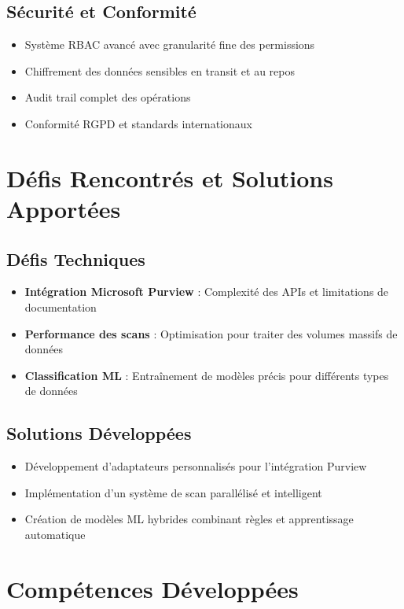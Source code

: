 \documentclass[12pt,a4paper]{article}
\begin{document}
\subsection{Sécurité et Conformité}

\begin{itemize}
    \item Système RBAC avancé avec granularité fine des permissions
    \item Chiffrement des données sensibles en transit et au repos
    \item Audit trail complet des opérations
    \item Conformité RGPD et standards internationaux
\end{itemize}

\section{Défis Rencontrés et Solutions Apportées}

\subsection{Défis Techniques}

\begin{itemize}
    \item \textbf{Intégration Microsoft Purview} : Complexité des APIs et limitations de documentation
    \item \textbf{Performance des scans} : Optimisation pour traiter des volumes massifs de données
    \item \textbf{Classification ML} : Entraînement de modèles précis pour différents types de données
\end{itemize}

\subsection{Solutions Développées}

\begin{itemize}
    \item Développement d'adaptateurs personnalisés pour l'intégration Purview
    \item Implémentation d'un système de scan parallélisé et intelligent
    \item Création de modèles ML hybrides combinant règles et apprentissage automatique
\end{itemize}

\section{Compétences Développées}
\end{document}
